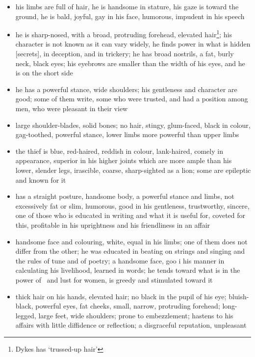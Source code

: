 \begin{itemize}[topsep=0em,itemsep=0em]
\item[\Aries] his limbs are full of hair, he is handsome in stature, his gaze is toward the ground, he is bald, joyful, gay in his face, humorous, impudent in his speech
\item[\Taurus] he is sharp-nosed, with a broad, protruding forehead,  elevated hair\footnote{Dykes has `trussed-up hair'}; his character is not known as it can vary widely, he finds power in what is hidden [secrets], in deception, and in trickery; he has broad nostrils, a fat, burly neck, black eyes; his eyebrows are smaller than the width of his eyes, and he is on the short side
\item[\Gemini] he has a powerful stance, wide shoulders; his gentleness and character are good; some of them write, some who were trusted, and had a position among men, who were pleasant in their view
\item[\Cancer] large shoulder-blades, solid bones; no hair, stingy, glum-faced, black in colour, gag-toothed, powerful stance, lower limbs more powerful than upper limbs
\item[\Leo] the thief is blue, red-haired, reddish in colour, lank-haired, comely in appearance, superior in his higher joints which are more ample than his lower, slender legs, irascible, coarse, sharp-sighted as a lion; some are epileptic and known for it
\item[\Virgo] has a straight posture, handsome body, a powerful stance and limbs, not excessively fat or slim, humorous, good in his gentleness, trustworthy, sincere, one of those who is educated in writing and what it is useful for, coveted for this, profitable in his uprightness and his friendliness in an affair
\item[\Libra] handsome face and colouring, white, equal in his limbs; one of them does not differ from the other; he was educated in beating on strings and singing and the rules of tune and of poetry; a handsome face, goo i his manner in calculating his livelihood, learned in words; he tends toward what is in the power of \Venus\, and lust for women, is greedy and stimulated toward it
\item[\Scorpio] thick hair on his hands, elevated hair; no black in the pupil of his eye; bluish-black, powerful eyes, fat cheeks, small, narrow, protruding forehead; long-legged, large feet, wide shoulders; prone to embezzlement; hastens to his affairs with little diffidence or reflection; a disgraceful reputation, unpleasant

\end{itemize}
